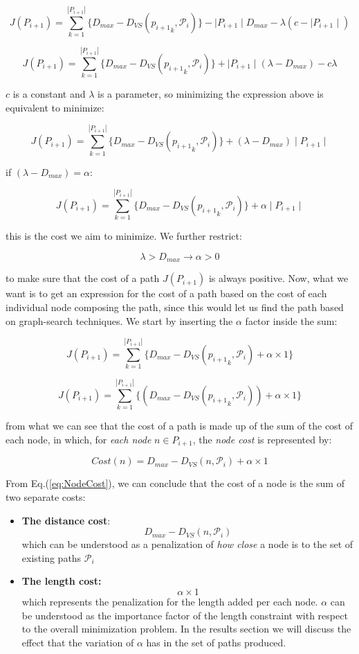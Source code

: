 \documentclass[graybox]{svmult}
\newcommand{\PathSet}{\ensuremath{\mathcal P} }
\newcommand{\Path}{\ensuremath{P} }
\newcommand{\VertexSetDistance}{\ensuremath{D_{VS}} }
\newcommand{\Dmax}{\ensuremath{D_{max}} }
\begin{document}
\[ J(\Path_{i+1}) = \sum _{k = 1}^{|\Path_{i+1}|} \{ \Dmax - \VertexSetDistance({p_{i+1}}_{k}, \PathSet_{i}) \} -\mid \Path_{i+1} \mid \Dmax   - \lambda(c - \mid \Path_{i+1} \mid ) \]

\[ J(\Path_{i+1}) = \sum _{k = 1}^{|\Path_{i+1}|} \{ \Dmax - \VertexSetDistance({p_{i+1}}_{k}, \PathSet_{i}) \} + \mid \Path_{i+1} \mid(\lambda - \Dmax ) - c\lambda \]

$c$ is a constant and $\lambda$ is a parameter, so minimizing the expression above is equivalent to minimize:

\[ J(\Path_{i+1}) = \sum _{k = 1}^{|\Path_{i+1}|} \{ \Dmax - \VertexSetDistance({p_{i+1}}_{k}, \PathSet_{i}) \} + (\lambda - \Dmax )\mid \Path_{i+1} \mid \]

if $(\lambda - \Dmax) = \alpha$:

\[ J(\Path_{i+1}) = \sum _{k = 1}^{|\Path_{i+1}|} \{ \Dmax - \VertexSetDistance({p_{i+1}}_{k}, \PathSet_{i}) \} + \alpha\mid \Path_{i+1} \mid \]

this is the cost we aim to minimize. We further restrict:

\[ \lambda > \Dmax \rightarrow \alpha > 0 \]

to make sure that the cost of a path $J(\Path_{i+1})$ is always positive. Now, what we want is to get an expression for the cost of a path based on the cost of each individual node composing the path, since this would let us find the path based on graph-search techniques. We start by inserting the $\alpha$ factor inside the sum:


\[ J(\Path_{i+1}) = \sum _{k = 1}^{|\Path_{i+1}|} \{ \Dmax - \VertexSetDistance({p_{i+1}}_{k}, \PathSet_{i}) + \alpha \times 1 \}  \]

\[ J(\Path_{i+1}) = \sum _{k = 1}^{|\Path_{i+1}|} \{ ( \Dmax - \VertexSetDistance({p_{i+1}}_{k}, \PathSet_{i}) ) + \alpha \times 1 \}  \]


from what we can see that the cost of a path is made up of the sum of the cost of each node, in which, for \emph{each node} $n \in \Path_{i+1}$, the \emph{node cost} is represented by:

\begin{equation} 
Cost(n) = \Dmax - \VertexSetDistance(n, \PathSet_{i}) + \alpha \times 1 
\label{eq:NodeCost}
\end{equation}

From Eq.(\ref{eq:NodeCost}), we can conclude that  the cost of a node is the sum of two separate costs:

\begin{itemize}
\item{ \textbf{The distance cost}:
\[ \Dmax - \VertexSetDistance(n, \PathSet_{i}) \]
which can be understood as a penalization of \emph{how close} a node is to the set of existing paths $\PathSet_{i}$}
\item{ \textbf{The length cost:}
\[ \alpha \times 1 \]
which represents the penalization for the length added per each node. $\alpha$ can be understood as the importance factor of the length constraint with respect to the overall minimization problem. In the results section we will discuss the effect that the variation of $\alpha$ has in the set of paths produced.}
\end{itemize}
\medskip
\end{document}
